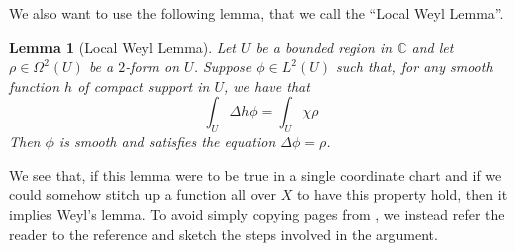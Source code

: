 \documentclass[11pt]{report}
\newtheorem{lemma}[thm]{Lemma}
\theoremstyle{definition}
\begin{document}
We also want to use the following lemma, that we call the ``Local Weyl Lemma''.
\begin{lemma}[Local Weyl Lemma]\label{WeylsLemmaLocal}
  Let $U$ be a bounded region in $\mathbb{C}$ and let $\rho \in \Omega^2(U)$ be a $2$-form on $U$. Suppose $\phi \in L^2(U)$ such that, for any smooth function $h$ of compact support in $U$, we have that 
  \[\int_U \Delta h\phi = \int_U \chi\rho\]
  Then $\phi$ is smooth and satisfies the equation $\Delta \phi = \rho$.
\end{lemma}
We see that, if this lemma were to be true in a single coordinate chart and if we could somehow stitch up a function all over $X$ to have this property hold, then it implies Weyl's lemma. To avoid simply copying pages from \cite[Chapter 10]{donaldson}, we instead refer the reader to the reference and sketch the steps involved in the argument.
\end{document}
